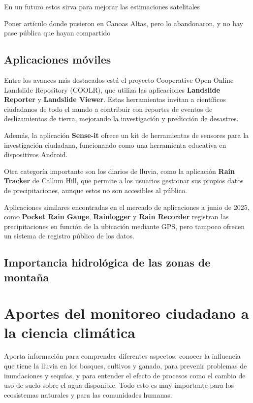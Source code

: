 En un futuro estos sirva para mejorar las estimaciones satelitales

Poner artículo donde pusieron en Canoas Altas, pero lo abandonaron, y no hay pase pública que hayan compartido











\subsection{Aplicaciones móviles}

Entre los avances más destacados está el proyecto Cooperative Open Online Landslide Repository (COOLR), que utiliza las aplicaciones \textbf{Landslide Reporter} y \textbf{Landslide Viewer}. Estas herramientas invitan a científicos ciudadanos de todo el mundo a contribuir con reportes de eventos de deslizamientos de tierra, mejorando la investigación y predicción de desastres.\cite{coolr2021} 

Además, la aplicación \textbf{Sense-it} ofrece un kit de herramientas de sensores para la investigación ciudadana, funcionando como una herramienta educativa en dispositivos Android.\cite{van2017senseit}


Otra categoría importante son los diarios de lluvia, como la aplicación \textbf{Rain Tracker} de Callum Hill, que permite a los usuarios gestionar sus propios datos de precipitaciones, aunque estos no son accesibles al público. \cite{hill2021raintracker}

Aplicaciones similares encontradas en el mercado de aplicaciones a junio de 2025, como \textbf{Pocket Rain Gauge}, \textbf{Rainlogger} y \textbf{Rain Recorder} registran las precipitaciones en función de la ubicación mediante GPS, pero tampoco ofrecen un sistema de registro público de los datos.


\subsection{Importancia hidrológica de las zonas de montaña}


\section{Aportes del monitoreo ciudadano a la ciencia climática}



Aporta información para comprender diferentes aspectos: conocer la influencia que tiene la lluvia en los bosques, cultivos y ganado, para prevenir problemas de inundaciones y sequías, y para entender el efecto de procesos como el cambio de uso de suelo sobre el agua disponible. Todo esto es muy importante para los ecosistemas naturales y para las comunidades humanas.



